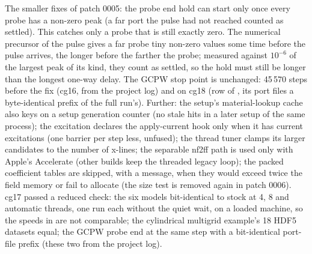 The smaller fixes of patch 0005: the probe end hold can start only once every probe has a non-zero peak (a far port
the pulse had not reached counted as settled). This catches only a probe that is still exactly zero. The numerical
precursor of the pulse gives a far probe tiny non-zero values some time before the pulse arrives, the longer before
the farther the probe; measured against $10^{-6}$ of the largest peak of its kind, they count as settled, so the hold
must still be longer than the longest one-way delay. The GCPW stop point is unchanged: 45\,570 steps before the fix
(cg16, from the project log) and on cg18 (row  of ,
its port files a byte-identical prefix of the full run's). Further: the setup's
material-lookup cache also keys on a setup generation counter (no stale hits in a later setup of the same process);
the excitation declares the apply-current hook only when it has current excitations (one barrier per step less,
unfused); the thread tuner clamps its larger candidates to the number of x-lines; the separable nf2ff path is used
only with Apple's Accelerate (other builds keep the threaded legacy loop); the packed coefficient tables are skipped,
with a message, when they would exceed twice the field memory or fail to allocate (the size test is removed again in
patch 0006). cg17 passed a reduced check: the six models bit-identical to stock at 4, 8 and automatic threads, one run
each without the quiet wait, on a loaded machine, so the speeds in  are not comparable; the
cylindrical multigrid example's 18 HDF5 datasets equal; the GCPW probe end at the same step with a bit-identical
port-file prefix (these two from the project log).

